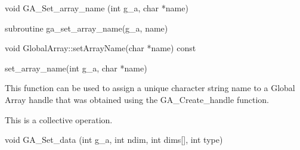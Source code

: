 \documentclass[12pt]{article}
\begin{document}

\begin{capi}
\begin{ccode}
void GA_Set_array_name (int g_a, char *name)
\end{ccode}
\begin{funcargs}
\end{funcargs}
\end{capi}

\begin{fapi}
\begin{fcode}
subroutine ga_set_array_name(g_a, name)
\end{fcode}
\begin{funcargs}
\end{funcargs}
\end{fapi}

\begin{cxxapi}
\begin{cxxcode}
void GlobalArray::setArrayName(char *name) const
\end{cxxcode}
\begin{funcargs}
\end{funcargs}
\end{cxxapi}

\begin{pyapi}
\begin{pycode}
set_array_name(int g_a, char *name)
\end{pycode}
\end{pyapi}

\begin{desc}

  This function can be used to assign a unique character string name
  to a Global Array handle that was obtained using the
  GA_Create_handle function.

  This is a collective operation.

\end{desc}



\begin{capi}
\begin{ccode}
void GA_Set_data (int g_a, int ndim, int dims[], int type)
\end{ccode}
\begin{funcargs}
\end{funcargs}
\end{capi}
\end{document}
